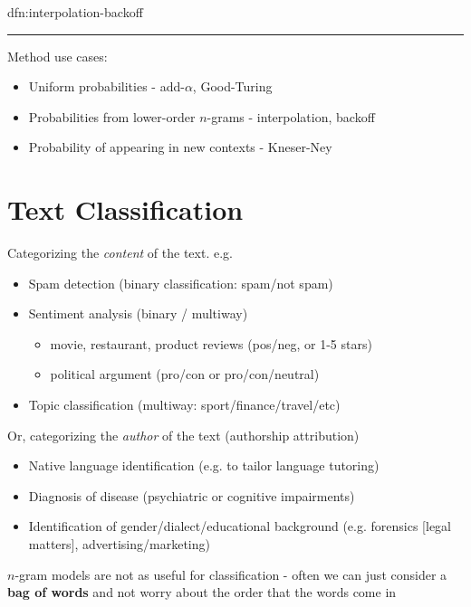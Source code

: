 \documentclass[landscape, 8pt]{extarticle}
\begin{document}
\begin{multicols}{3}
\begin{dfn}{dfn:interpolation-backoff}{}
    \noindent\rule{\textwidth}{0.2pt}
    Method use cases:
    \begin{itemize}
        \item Uniform probabilities - add-$\alpha$, Good-Turing
        \item Probabilities from lower-order $n$-grams - interpolation, backoff
        \item Probability of appearing in new contexts - Kneser-Ney
    \end{itemize}
\end{dfn}

\newpage
\section{Text Classification}
\vspace{-5pt}
Categorizing the \textit{content} of the text. e.g.
\vspace{-2pt}
\begin{itemize}
    \setlength\itemsep{0em}
    \item Spam detection (binary classification: spam/not spam)
    \item Sentiment analysis (binary / multiway)
        \vspace{-2pt}
        \begin{itemize}
            \setlength\itemsep{0em}
            \item movie, restaurant, product reviews (pos/neg, or 1-5 stars)
            \item political argument (pro/con or pro/con/neutral)
        \end{itemize}
    \item Topic classification (multiway: sport/finance/travel/etc)
\end{itemize}
Or, categorizing the \textit{author} of the text (authorship attribution)
\vspace{-2pt}
\begin{itemize}
    \setlength\itemsep{0em}
    \item Native language identification (e.g. to tailor language tutoring)
    \item Diagnosis of disease (psychiatric or cognitive impairments)
    \item Identification of gender/dialect/educational background (e.g. forensics [legal matters], advertising/marketing)
\end{itemize}

$n$-gram models are not as useful for classification - often we can just consider a \textbf{bag of words} and not worry about the order that the words come in


\end{multicols}
\end{document}
